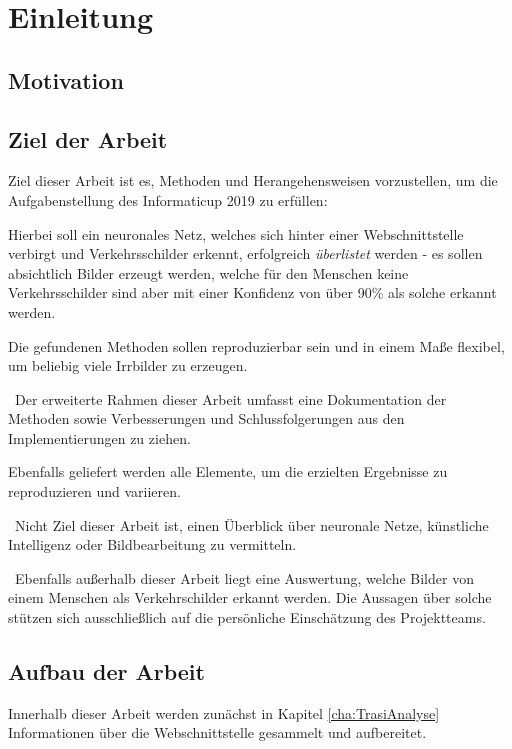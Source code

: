 \chapter{Einleitung}
\label{cha:Einleitung}
\setlength{\epigraphwidth}{4in}

\section{Motivation}

\section{Ziel der Arbeit}
\label{sec:ZielDerArbeit}
Ziel dieser Arbeit ist es, Methoden und Herangehensweisen vorzustellen, um die Aufgabenstellung des Informaticup 2019  zu erfüllen: 

Hierbei soll ein neuronales Netz, welches sich hinter einer Webschnittstelle verbirgt und Verkehrsschilder erkennt, erfolgreich \textit{überlistet} werden - es sollen absichtlich Bilder erzeugt werden, welche für den Menschen keine Verkehrsschilder sind aber mit einer Konfidenz von über 90\% als solche erkannt werden. 

Die gefundenen Methoden sollen reproduzierbar sein und in einem Maße flexibel, um beliebig viele Irrbilder zu erzeugen. 

~\newline Der erweiterte Rahmen dieser Arbeit umfasst eine Dokumentation der Methoden sowie Verbesserungen und Schlussfolgerungen aus den Implementierungen zu ziehen. 

Ebenfalls geliefert werden alle Elemente, um die erzielten Ergebnisse zu reproduzieren und variieren. 

~\newline Nicht Ziel dieser Arbeit ist, einen Überblick über neuronale Netze, künstliche Intelligenz oder Bildbearbeitung zu vermitteln. 

~\newline Ebenfalls außerhalb dieser Arbeit liegt eine Auswertung, welche Bilder von einem Menschen als Verkehrschilder erkannt werden. Die Aussagen über solche stützen sich ausschließlich auf die persönliche Einschätzung des Projektteams. 
\section{Aufbau der Arbeit}
Innerhalb dieser Arbeit werden zunächst in Kapitel \ref{cha:TrasiAnalyse} Informationen über die Webschnittstelle gesammelt und aufbereitet. 

